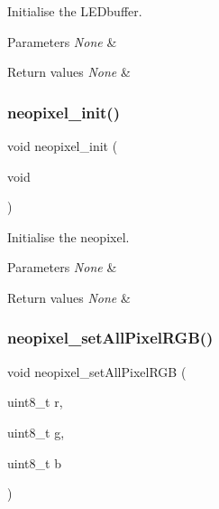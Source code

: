 Initialise the L\+E\+Dbuffer. 


\begin{DoxyParams}{Parameters}
{\em None} & \\
\hline
\end{DoxyParams}

\begin{DoxyRetVals}{Return values}
{\em None} & \\
\hline
\end{DoxyRetVals}
\mbox{\label{group___neo_pixel_gaac78468985e44a3e4d353ea9276b33bc}} 
\subsubsection{\texorpdfstring{neopixel\+\_\+init()}{neopixel\_init()}}
{\footnotesize\ttfamily void neopixel\+\_\+init (\begin{DoxyParamCaption}\item[{void}]{ }\end{DoxyParamCaption})}



Initialise the neopixel. 


\begin{DoxyParams}{Parameters}
{\em None} & \\
\hline
\end{DoxyParams}

\begin{DoxyRetVals}{Return values}
{\em None} & \\
\hline
\end{DoxyRetVals}
\mbox{\label{group___neo_pixel_ga7a6c2dc149e86a788aede1d6aa5262d7}} 
\subsubsection{\texorpdfstring{neopixel\+\_\+set\+All\+Pixel\+R\+G\+B()}{neopixel\_setAllPixelRGB()}}
{\footnotesize\ttfamily void neopixel\+\_\+set\+All\+Pixel\+R\+GB (\begin{DoxyParamCaption}\item[{uint8\+\_\+t}]{r,  }\item[{uint8\+\_\+t}]{g,  }\item[{uint8\+\_\+t}]{b }\end{DoxyParamCaption})}



